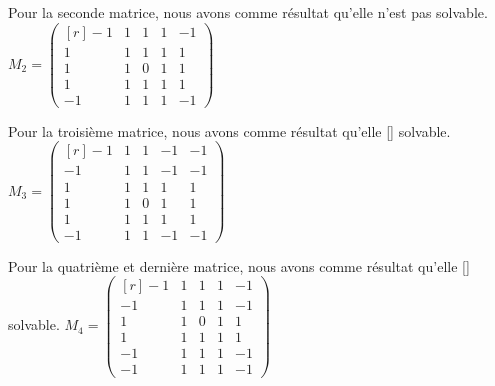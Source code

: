 \documentclass[utf8]{article}
\begin{document}
Pour la seconde matrice, nous avons comme résultat qu'elle n'est pas solvable.\vspace{0.25cm} \newline
\hspace{5cm}
$M_2 = \begin{pmatrix*}[r]
-1 & 1 & 1 & 1 & -1\\
 1 & 1 & 1 & 1 &  1\\
 1 & 1 & 0 & 1 &  1\\
 1 & 1 & 1 & 1 &  1\\
-1 & 1 & 1 & 1 & -1
\end{pmatrix*}$
\newline

Pour la troisième matrice, nous avons comme résultat qu'elle [] solvable.\vspace{0.25cm} \newline
\hspace{5cm}
$M_3 = \begin{pmatrix*}[r]
-1 & 1 & 1 & -1 & -1\\
-1 & 1 & 1 & -1 & -1\\
 1 & 1 & 1 &  1 &  1\\
 1 & 1 & 0 &  1 &  1\\
 1 & 1 & 1 &  1 &  1\\
-1 & 1 & 1 & -1 & -1
\end{pmatrix*}$
\newline

Pour la quatrième et dernière matrice, nous avons comme résultat qu'elle [] solvable.\vspace{0.25cm} \newline
\hspace{5cm}
$M_4 = \begin{pmatrix*}[r]
-1 & 1 & 1 & 1 & -1\\
-1 & 1 & 1 & 1 & -1\\
 1 & 1 & 0 & 1 &  1\\
 1 & 1 & 1 & 1 &  1\\
-1 & 1 & 1 & 1 & -1\\
-1 & 1 & 1 & 1 & -1
\end{pmatrix*}$
\end{document}
